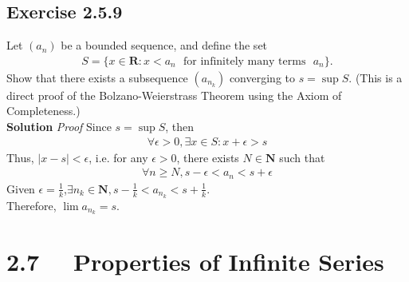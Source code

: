\documentclass[12pt]{report}
\begin{document}
\subsection*{Exercise 2.5.9}
Let $(a_n)$ be a bounded sequence, and define the set
\begin{align*}
    S = \{x \in \mathbf{R}: x< a_n \text{~~for infinitely many terms~~} a_n\}.
\end{align*}
Show that there exists a subsequence $(a_{n_k} )$ converging to $s = \sup S$. (This is a
direct proof of the Bolzano-Weierstrass Theorem using the Axiom of
Completeness.)\\
\textbf{Solution} \textit{Proof} Since $s = \sup S$, then
\begin{align*}
    \forall \epsilon > 0, \exists x \in S: x+\epsilon>s
\end{align*}
Thus, $|x-s|< \epsilon$, i.e. for any $\epsilon >0$, 
there exists $N \in \mathbf{N}$ such that
\begin{align*}
    \forall n \geq N, s-\epsilon<a_n<s+\epsilon
\end{align*}
Given $\epsilon = \frac{1}{k}$,$\exists n_k\in \mathbf{N}, s-\frac{1}{k}<a_{n_k}<s+\frac{1}{k}$.\\
Therefore, $\lim a_{n_k} = s$.

\section{2.7 ~~Properties of Infinite Series}
\end{document}
